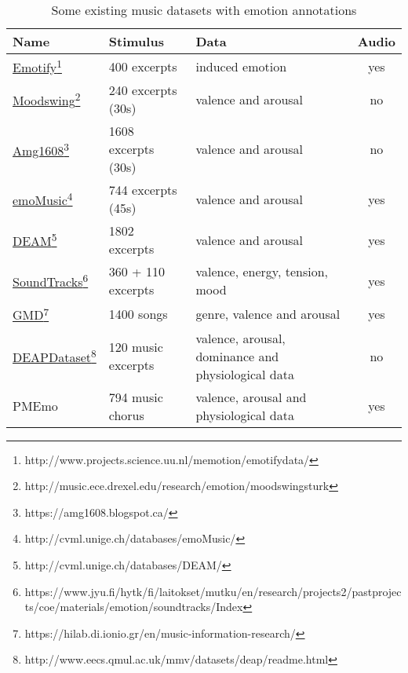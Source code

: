 \begin{savenotes}
\begin{table}[h!]
	\centering
	\begin{tabular}{|l|l|p{}|c|}
		\hline
		Name & Stimulus & Data & Audio\\ [0.5ex] 
		\hline\hline \href{http://www.projects.science.uu.nl/memotion/emotifydata/}{Emotify}\footnote{http://www.projects.science.uu.nl/memotion/emotifydata/}  & 400 excerpts & induced emotion & yes	\\ 
		\hline \href{http://music.ece.drexel.edu/research/emotion/moodswingsturk}{Moodswing}\footnote{http://music.ece.drexel.edu/research/emotion/moodswingsturk} & 240 excerpts (30s) & valence and arousal & no \\
		\hline \href{https://amg1608.blogspot.ca/}{Amg1608}\footnote{https://amg1608.blogspot.ca/} & 1608 excerpts (30s) & valence and arousal & no \\
		\hline \href{http://cvml.unige.ch/databases/emoMusic/}{emoMusic}\footnote{http://cvml.unige.ch/databases/emoMusic/} & 744 excerpts (45s) & valence and arousal & yes \\
		\hline \href{http://cvml.unige.ch/databases/DEAM/}{DEAM}\footnote{http://cvml.unige.ch/databases/DEAM/} & 1802 excerpts & valence and arousal & yes \\
		\hline \href{https://www.jyu.fi/hytk/fi/laitokset/mutku/en/research/projects2/pastprojects/coe/materials/emotion/soundtracks/Index}{SoundTracks}\footnote{https://www.jyu.fi/hytk/fi/laitokset/mutku/en/research/projects2/\newline pastprojects/coe/materials/emotion/soundtracks/Index} & 360 + 110 excerpts & valence, energy, tension, mood & yes \\
		\hline \href{https://hilab.di.ionio.gr/en/music-information-research/}{GMD}\footnote{https://hilab.di.ionio.gr/en/music-information-research/} & 1400 songs & genre, valence and arousal & yes \\
		\hline \href{http://www.eecs.qmul.ac.uk/mmv/datasets/deap/readme.html}{DEAPDataset}\footnote{http://www.eecs.qmul.ac.uk/mmv/datasets/deap/readme.html} & 120 music excerpts & valence, arousal, dominance and physiological data & no \\
		\hline PMEmo & 794 music chorus & valence, arousal and physiological data & yes \\
		\hline
	\end{tabular}
	\caption{Some existing music datasets with emotion annotations}
	\label{table:datasets}
\end{table}
\end{savenotes}

